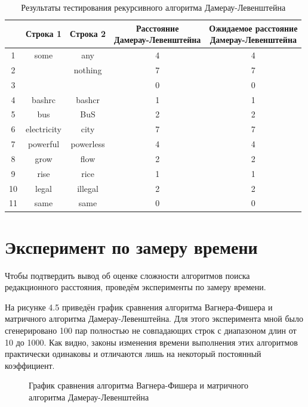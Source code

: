 \begin{table}[H]
    \caption{Результаты тестирования рекурсивного алгоритма Дамерау-Левенштейна}
	\begin{tabular}{|c|c|c|c|c|}
 	\hline
    \No{} & Строка 1 & Строка 2 & \makecell{Расстояние\\Дамерау-Левенштейна} & \makecell{Ожидаемое расстояние\\Дамерау-Левенштейна} \\
 	\hline
 	1 & some & any & 4 & 4\\
 	\hline
 	2 & & nothing & 7 & 7\\
 	\hline
 	3 & & & 0 & 0\\
 	\hline
 	4 & bashrc & bashcr & 1 & 1\\
 	\hline
 	5 & bus & BuS & 2 & 2\\
 	\hline
 	6 & electricity & city & 7 & 7\\
 	\hline
 	7 & powerful & powerless & 4 & 4\\
 	\hline
 	8 & grow & flow & 2 & 2\\
 	\hline
 	9 & rise & rice & 1 & 1\\
 	\hline
    10 & legal & illegal & 2 & 2\\
 	\hline
    11 & same & same & 0 & 0\\
    \hline
	\end{tabular}
\end{table}

\section{Эксперимент по замеру времени}
Чтобы подтвердить вывод об оценке сложности алгоритмов поиска редакционного расстояния, проведём эксперименты по замеру времени.

На рисунке 4.5 приведён график сравнения алгоритма Вагнера-Фишера и матричного алгоритма Дамерау-Левенштейна. Для этого эксперимента мной было сгенерировано 100 пар полностью не совпадающих строк с диапазоном длин от 10 до 1000. Как видно, законы изменения времени выполнения этих алгоритмов практически одинаковы и отличаются лишь на некоторый постоянный коэффициент.
\begin{figure}[H]
    \centering
    \caption{График сравнения алгоритма Вагнера-Фишера и матричного алгоритма Дамерау-Левенштейна}
\end{figure}

